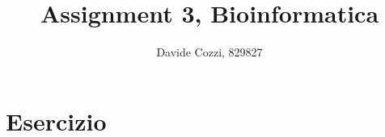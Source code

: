 \documentclass[a4paper,12pt, oneside]{book}
\title{Assignment 3, Bioinformatica}
\author{Davide Cozzi, 829827}
\date{}
\begin{document}
\maketitle

\newtheorem{teorema}{Teorema}
\newtheorem{definizione}{Definizione}
\newtheorem{esempio}{Esempio}
\newtheorem{corollario}{Corollario}
\newtheorem{lemma}{Lemma}
\newtheorem{osservazione}{Osservazione}
\newtheorem{nota}{Nota}
\newtheorem{esercizio}{Esercizio}

\renewcommand{\chaptermark}[1]{%
  \markboth{\chaptername
    \ \thechapter.\ #1}{}}
\renewcommand{\sectionmark}[1]{\markright{\thesection.\ #1}}
\tableofcontents
\chapter{Esercizio}
\end{document}
